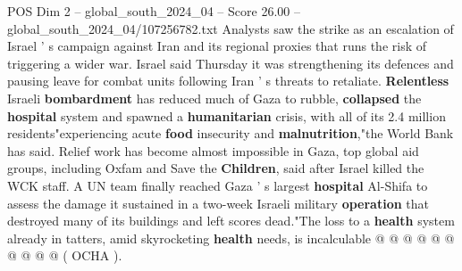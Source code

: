 \begin{textsample}{POS Dim 2 – global\_south\_2024\_04 – Score 26.00 – global\_south\_2024\_04/107256782.txt}
Analysts saw the strike as an escalation of Israel ' s campaign against Iran and its regional proxies that runs the risk of triggering a wider war.
Israel said Thursday it was strengthening its defences and pausing leave for combat units following Iran ' s threats to retaliate. \textbf{Relentless} Israeli \textbf{bombardment} has reduced much of Gaza to rubble, \textbf{collapsed} the \textbf{hospital} system and spawned a \textbf{humanitarian} crisis, with all of its 2.4 million residents"experiencing acute \textbf{food} insecurity and \textbf{malnutrition},"the World Bank has said.
Relief work has become almost impossible in Gaza, top global aid groups, including Oxfam and Save the \textbf{Children}, said after Israel killed the WCK staff.
A UN team finally reached Gaza ' s largest \textbf{hospital} Al-Shifa to assess the damage it sustained in a two-week Israeli military \textbf{operation} that destroyed many of its buildings and left scores dead."The loss to a \textbf{health} system already in tatters, amid skyrocketing \textbf{health} needs, is incalculable @ @ @ @ @ @ @ @ @ @ ( OCHA ).

\end{textsample}
